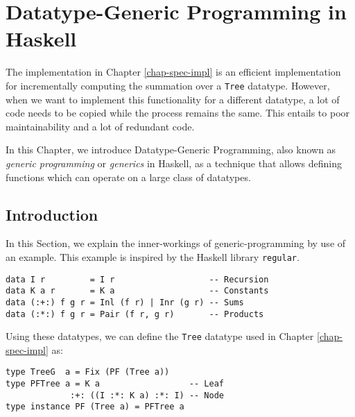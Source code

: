 \chapter{Datatype-Generic Programming in Haskell}

The implementation in Chapter \ref{chap-spec-impl} is an efficient implementation for incrementally computing the summation over a \texttt{Tree} datatype. However, when we want to implement this functionality for a different datatype, a lot of code needs to be copied while the process remains the same. This entails to poor maintainability and a lot of redundant code.

In this Chapter, we introduce Datatype-Generic Programming, also known as \textit{generic programming} or \textit{generics} in Haskell, as a technique that allows defining functions which can operate on a large class of datatypes. 



\section{Introduction}
In this Section, we explain the inner-workings of generic-programming by use of an example. This example is inspired by the Haskell library \texttt{regular}.
\begin{verbatim}
data I r         = I r                   -- Recursion
data K a r       = K a                   -- Constants
data (:+:) f g r = Inl (f r) | Inr (g r) -- Sums
data (:*:) f g r = Pair (f r, g r)       -- Products
\end{verbatim}

Using these datatypes, we can define the \texttt{Tree} datatype used in Chapter \ref{chap-spec-impl} as:

\begin{verbatim}
type TreeG  a = Fix (PF (Tree a))
type PFTree a = K a                  -- Leaf
             :+: ((I :*: K a) :*: I) -- Node
type instance PF (Tree a) = PFTree a
\end{verbatim}


